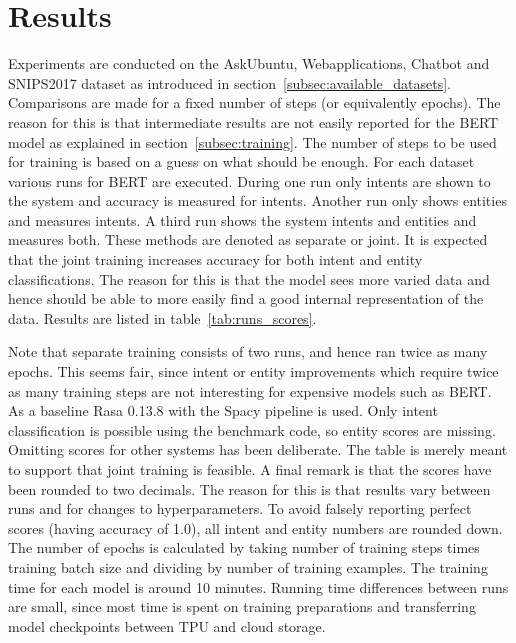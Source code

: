 \section{Results}
\label{sec:results}

Experiments are conducted on the AskUbuntu, Webapplications, Chatbot and SNIPS2017 dataset as introduced in section~\ref{subsec:available_datasets}.
Comparisons are made for a fixed number of steps (or equivalently epochs).
The reason for this is that intermediate results are not easily reported for the BERT model as explained in section~\ref{subsec:training}.
The number of steps to be used for training is based on a guess on what should be enough.
For each dataset various runs for BERT are executed.
During one run only intents are shown to the system and accuracy is measured for intents.
Another run only shows entities and measures intents.
A third run shows the system intents and entities and measures both.
These methods are denoted as separate or joint.
It is expected that the joint training increases accuracy for both intent and entity classifications.
The reason for this is that the model sees more varied data and hence should be able to more easily find a good internal representation of the data.
Results are listed in table~\ref{tab:runs_scores}.

Note that separate training consists of two runs, and hence ran twice as many epochs.
This seems fair, since intent or entity improvements which require twice as many training steps are not interesting for expensive models such as BERT.
As a baseline Rasa 0.13.8 with the Spacy pipeline is used.
Only intent classification is possible using the benchmark code, so entity scores are missing.
Omitting scores for other systems has been deliberate.
The table is merely meant to support that joint training is feasible.
A final remark is that the scores have been rounded to two decimals.
The reason for this is that results vary between runs and for changes to hyperparameters.
To avoid falsely reporting perfect scores (having accuracy of 1.0), all intent and entity numbers are rounded down.
The number of epochs is calculated by taking number of training steps times training batch size and dividing by number of training examples.
The training time for each model is around 10 minutes.
Running time differences between runs are small, since most time is spent on training preparations and transferring model checkpoints between TPU and cloud storage.

